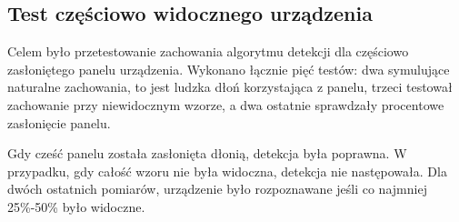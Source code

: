 \documentclass[12pt,twoside,polish]{article}
\begin{document}
\subsection{Test częściowo widocznego urządzenia}
\label{section:partlyvisible}
Celem było przetestowanie zachowania algorytmu detekcji dla częściowo zasłoniętego panelu urządzenia. Wykonano łącznie pięć testów: dwa symulujące naturalne zachowania, to jest ludzka dłoń korzystająca z panelu, trzeci testował zachowanie przy niewidocznym wzorze, a dwa ostatnie sprawdzały procentowe zasłonięcie panelu.

Gdy cześć panelu została zasłonięta dłonią, detekcja była poprawna. W przypadku, gdy całość wzoru nie była widoczna, detekcja nie następowała. Dla dwóch ostatnich pomiarów, urządzenie było rozpoznawane jeśli co najmniej 25\%-50\% było widoczne.
\end{document}

